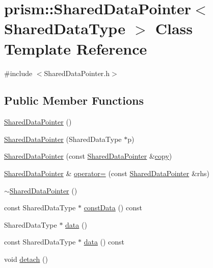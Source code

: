 \hypertarget{classprism_1_1_shared_data_pointer}{}\section{prism\+:\+:Shared\+Data\+Pointer$<$ Shared\+Data\+Type $>$ Class Template Reference}
\label{classprism_1_1_shared_data_pointer}


{\ttfamily \#include $<$Shared\+Data\+Pointer.\+h$>$}

\subsection*{Public Member Functions}
\begin{DoxyCompactItemize}
\item 
\hyperlink{classprism_1_1_shared_data_pointer_aae89ba1520cd16d5d6efc06c3c763a57}{Shared\+Data\+Pointer} ()
\item 
\hyperlink{classprism_1_1_shared_data_pointer_a8f33e2be524ada8415b31533876f7a4d}{Shared\+Data\+Pointer} (Shared\+Data\+Type $\ast$p)
\item 
\hyperlink{classprism_1_1_shared_data_pointer_a3e8fb06e78156d0341984e8ef4002f6e}{Shared\+Data\+Pointer} (const \hyperlink{classprism_1_1_shared_data_pointer}{Shared\+Data\+Pointer} \&\hyperlink{namespaceprism_ae776f4cd825f79e7af1cf6ee1d90a209}{copy})
\item 
\hyperlink{classprism_1_1_shared_data_pointer}{Shared\+Data\+Pointer} \& \hyperlink{classprism_1_1_shared_data_pointer_a1e683956ccbe47d262c92f934d04f254}{operator=} (const \hyperlink{classprism_1_1_shared_data_pointer}{Shared\+Data\+Pointer} \&rhs)
\item 
\hyperlink{classprism_1_1_shared_data_pointer_a0c2b49901e71a8d43a0b34685653032c}{$\sim$\+Shared\+Data\+Pointer} ()
\item 
const Shared\+Data\+Type $\ast$ \hyperlink{classprism_1_1_shared_data_pointer_a4748e8c520ac7cc9d73d2c763cbad7fb}{const\+Data} () const 
\item 
Shared\+Data\+Type $\ast$ \hyperlink{classprism_1_1_shared_data_pointer_ae0acea5732c353a5ce4afb54c07e7302}{data} ()
\item 
const Shared\+Data\+Type $\ast$ \hyperlink{classprism_1_1_shared_data_pointer_a2d6b477eed9cb60c0197cce0361f37cd}{data} () const 
\item 
void \hyperlink{classprism_1_1_shared_data_pointer_aa222b261cf3a1ef3c36affa1ae6eda3a}{detach} ()

\end{DoxyCompactItemize}
